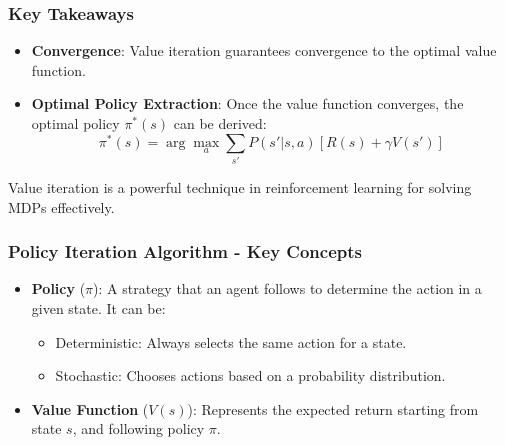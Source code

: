 \documentclass[aspectratio=169]{beamer}
\begin{document}
\begin{frame}[fragile]
    \frametitle{Key Takeaways}

    \begin{itemize}
        \item \textbf{Convergence}: Value iteration guarantees convergence to the optimal value function.
        \item \textbf{Optimal Policy Extraction}: Once the value function converges, the optimal policy $\pi^*(s)$ can be derived:
        \[
        \pi^*(s) = \arg \max_a \sum_{s'} P(s' | s, a) [R(s) + \gamma V(s')]
        \]
    \end{itemize}

    Value iteration is a powerful technique in reinforcement learning for solving MDPs effectively.
\end{frame}

\begin{frame}[fragile]
    \frametitle{Policy Iteration Algorithm - Key Concepts}
    \begin{itemize}
        \item \textbf{Policy} ($\pi$): A strategy that an agent follows to determine the action in a given state. It can be:
        \begin{itemize}
            \item Deterministic: Always selects the same action for a state.
            \item Stochastic: Chooses actions based on a probability distribution.
        \end{itemize}
        
        \item \textbf{Value Function} ($V(s)$): Represents the expected return starting from state $s$, and following policy $\pi$. 
    \end{itemize}
\end{frame}
\end{document}
